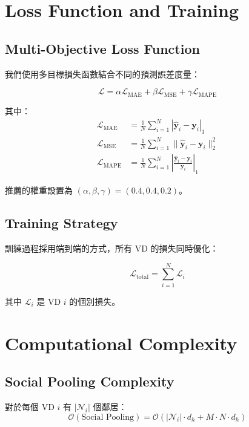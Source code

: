\documentclass[11pt,a4paper]{article}
\begin{document}
\section{Loss Function and Training}

\subsection{Multi-Objective Loss Function}

我們使用多目標損失函數結合不同的預測誤差度量：

\begin{equation}
\mathcal{L} = \alpha \mathcal{L}_{\text{MAE}} + \beta \mathcal{L}_{\text{MSE}} + \gamma \mathcal{L}_{\text{MAPE}}
\end{equation}

其中：
\begin{align}
\mathcal{L}_{\text{MAE}} &= \frac{1}{N} \sum_{i=1}^N |\hat{\mathbf{y}}_i - \mathbf{y}_i|_1 \\
\mathcal{L}_{\text{MSE}} &= \frac{1}{N} \sum_{i=1}^N \|\hat{\mathbf{y}}_i - \mathbf{y}_i\|_2^2 \\
\mathcal{L}_{\text{MAPE}} &= \frac{1}{N} \sum_{i=1}^N \left|\frac{\hat{\mathbf{y}}_i - \mathbf{y}_i}{\mathbf{y}_i}\right|_1
\end{align}

推薦的權重設置為 $(\alpha, \beta, \gamma) = (0.4, 0.4, 0.2)$。

\subsection{Training Strategy}

訓練過程採用端到端的方式，所有 VD 的損失同時優化：

\begin{equation}
\mathcal{L}_{\text{total}} = \sum_{i=1}^N \mathcal{L}_i
\end{equation}

其中 $\mathcal{L}_i$ 是 VD $i$ 的個別損失。

\section{Computational Complexity}

\subsection{Social Pooling Complexity}

對於每個 VD $i$ 有 $|\mathcal{N}_i|$ 個鄰居：
\begin{equation}
\mathcal{O}(\text{Social Pooling}) = \mathcal{O}(|\mathcal{N}_i| \cdot d_h + M \cdot N \cdot d_h)
\end{equation}
\end{document}
